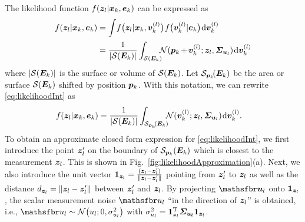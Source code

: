 \documentclass[11pt,a4paper]{article}
\newcommand{\ist}{\hspace*{.3mm}}
\newcommand{\rmv}{\hspace*{-.3mm}}
\newcommand{\nn}{\nonumber}
\begin{document}
The likelihood function $f(\bm{z}_{l} | \bm{x}_{k}, \bm{e}_{k})$ can be expressed as
\begin{align}
f(\V{z}_{l} | \V{x}_{k}, \V{e}_{k}) &= \int \rmv\rmv  f\big(\V{z}_{l} | \V{x}_{k}, \V{v}^{(l)}_k\big) \ist f\big(\V{v}^{(l)}_k| \V{e}_{k}\big) \ist  \mathrm{d} \V{v}^{(l)}_k \nn\\[.5mm]
&= \frac{1}{|\Set{S}(\M{E}_{k})|} \int_{\Set{S}(\M{E}_{k})} \rmv\rmv \rmv\rmv  \rmv\rmv  \mathcal{N}(\V{p}_{k} \rmv+\rmv \V{v}^{(l)}_{k};\V{z}_{l},\M{\Sigma}_{\V{u}_{l}} ) \ist \mathrm{d} \V{v}^{(l)}_k \label{eq:likelihoodInt}
\end{align}
where $|\Set{S}(\M{E}_{k})|$ is the surface or volume of $\Set{S}(\M{E}_{k})$. Let $\Set{S}_{\V{p}_{k}}\rmv\rmv(\M{E}_{k})$ be the area or surface $\Set{S}(\M{E}_{k})$ shifted by position $\bm{p}_{k}$. With this notation, we can rewrite \eqref{eq:likelihoodInt} as
\begin{align}
f(\V{z}_{l} | \V{x}_{k}, \V{e}_{k}) &= \frac{1}{| \Set{S}(\M{E}_{k}) |} \int_{\Set{S}_{\V{p}_{k}}\rmv\rmv(\M{E}_{k})} \rmv\rmv \rmv\rmv  \rmv\rmv  \mathcal{N}(\V{v}^{(l)}_{k};\V{z}_{l},\M{\Sigma}_{\V{u}_{l}} ) \ist \mathrm{d} \V{v}^{(l)}_k. \label{eq:likelihoodInt2}
\end{align}
To obtain an approximate closed form expression for \eqref{eq:likelihoodInt}, we first introduce the point $\bm{z}'_{l}$ on the boundary of $\Set{S}_{\V{p}_{k}}(\M{E}_{k})$ which is closest to the measurement $\bm{z}_{l}$. This is shown in Fig.~\ref{fig:likelihoodApproximation}(a). Next, we also introduce the unit vector $\bm{1}_{\bm{z}_{l}} =  \frac{(\bm{z}_{l} - \bm{z}'_{l} )}{ \| \bm{z}_{l} - \bm{z}'_{l} \|}$ pointing from $\bm{z}'_{l}$ to $\bm{z}_{l}$ as well as the distance $d_{\bm{z}_{l}} =  \| \bm{z}_{l} - \bm{z}'_{l} \|$  between $\bm{z}'_{l}$ and $\bm{z}_{l}$. By projecting $\RV{u}_{l}$ onto $\bm{1}_{\bm{z}_{l}}$, the scalar measurement noise $\rv{u}_{l}$ ``in the direction of $\bm{z}_{l}$'' is obtained, i.e., $\rv{u}_{l} \sim \mathcal{N}\big(u_{l} ;0,\sigma^2_{u_{l}}\big)$ with $\sigma^2_{u_{l}} = \V{1}^{\mathrm{T}}_{\V{z}_{l}} \M{\Sigma}_{\V{u_l}} \V{1}_{\V{z}_{l}}$. 
\end{document}
